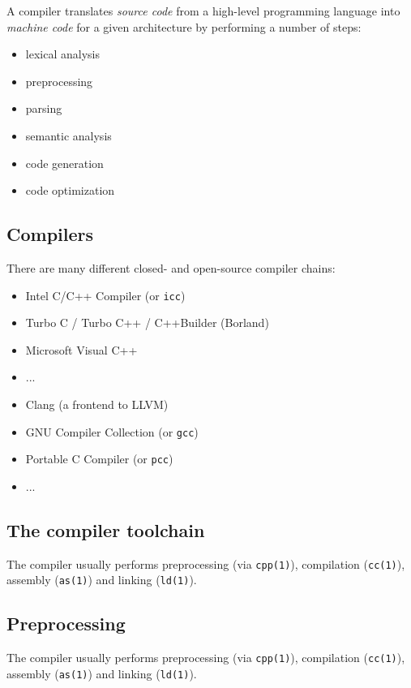 \documentclass[xga]{xdvislides}
\begin{document}
A compiler translates {\em source code} from a high-level programming
language into {\em machine code} for a given architecture by performing a
number of steps:

\begin{itemize}
	\item lexical analysis
	\item preprocessing
	\item parsing
	\item semantic analysis
	\item code generation
	\item code optimization
\end{itemize}


\subsection{Compilers}

There are many different closed- and open-source compiler chains:

\begin{itemize}
	\item Intel C/C++ Compiler (or \verb+icc+)
	\item Turbo C / Turbo C++ / C++Builder (Borland)
	\item Microsoft Visual C++
	\item ...
\\

	\item Clang (a frontend to LLVM)
	\item GNU Compiler Collection (or \verb+gcc+)
	\item Portable C Compiler (or \verb+pcc+)
	\item ...
\end{itemize}

\subsection{The compiler toolchain}

The compiler usually performs preprocessing (via {\tt cpp(1)}), compilation
({\tt cc(1)}), assembly ({\tt as(1)}) and linking ({\tt ld(1)}).

\subsection{Preprocessing}

The compiler usually performs preprocessing (via {\tt cpp(1)}), compilation
({\tt cc(1)}), assembly ({\tt as(1)}) and linking ({\tt ld(1)}).
\end{document}
